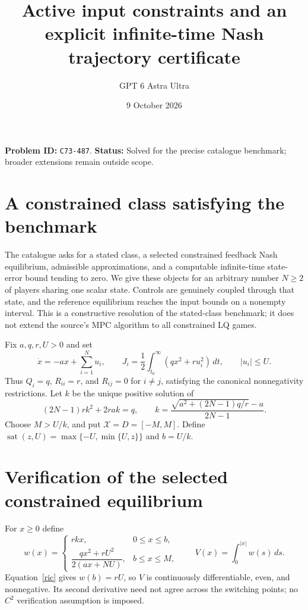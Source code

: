 \documentclass[11pt]{article}
\title{Active input constraints and an explicit infinite-time Nash trajectory certificate}
\author{GPT 6 Astra Ultra}
\date{9 October 2026}
\theoremstyle{remark}
\newcommand{\sat}{\operatorname{sat}}
\begin{document}
\maketitle
\noindent\textbf{Problem ID:} \texttt{C73-487}. \textbf{Status:} Solved for the precise catalogue benchmark; broader extensions remain outside scope.

\section{A constrained class satisfying the benchmark}
The catalogue asks for a stated class, a selected constrained feedback Nash equilibrium, admissible approximations, and a computable infinite-time state-error bound tending to zero. We give these objects for an arbitrary number $N\geq2$ of players sharing one scalar state. Controls are genuinely coupled through that state, and the reference equilibrium reaches the input bounds on a nonempty interval. This is a constructive resolution of the stated-class benchmark; it does not extend the source's MPC algorithm to all constrained LQ games.

Fix $a,q,r,U>0$ and set
\[
 \dot x=-ax+\sum_{i=1}^Nu_i,\qquad
 J_i=\frac12\int_{t_0}^{\infty}(qx^2+ru_i^2)\,dt,
 \qquad |u_i|\leq U.
\]
Thus $Q_i=q$, $R_{ii}=r$, and $R_{ij}=0$ for $i\ne j$, satisfying the canonical nonnegativity restrictions. Let $k$ be the unique positive solution of
\begin{equation}\label{ric}
 (2N-1)rk^2+2rak=q,
 \qquad
 k=\frac{\sqrt{a^2+(2N-1)q/r}-a}{2N-1}.
\end{equation}
Choose $M>U/k$, and put $\mathcal X=D=[-M,M]$. Define
$\sat(z,U)=\max\{-U,\min\{U,z\}\}$ and $b=U/k$.

\section{Verification of the selected constrained equilibrium}
For $x\geq0$ define
\[
 w(x)=
 \begin{cases}
 rkx,&0\leq x\leq b,\\[2mm]
 \dfrac{qx^2+rU^2}{2(ax+NU)},&b\leq x\leq M,
 \end{cases}
 \qquad V(x)=\int_0^{|x|}w(s)\,ds.
\]
Equation~\eqref{ric} gives $w(b)=rU$, so $V$ is continuously differentiable, even, and nonnegative. Its second derivative need not agree across the switching points; no $C^2$ verification assumption is imposed.
\end{document}
